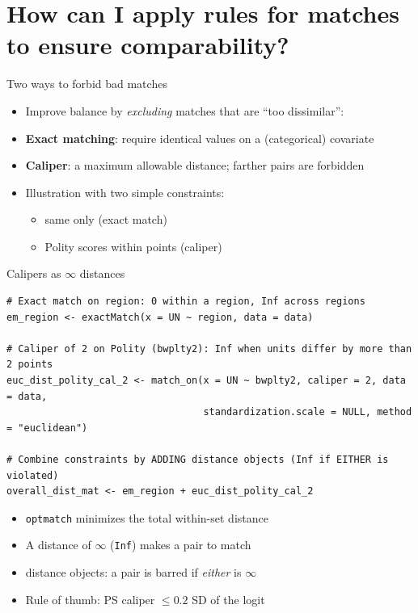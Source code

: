 \documentclass[table, xcolor = {dvipsnames}, 9pt]{beamer}
\theoremstyle{plain}
\newcommand{\mh}[1]{{\color{magenta}{#1}}}
\begin{document}
\section{How can I apply rules for matches to ensure comparability?}

\begin{frame}[t]{Two ways to forbid bad matches}
\vfill
\begin{itemize} \vfill
\item Improve balance by \emph{excluding} matches that are ``too dissimilar'': \vfill
\item \textbf{Exact matching}: require identical values on a (categorical) covariate \vfill
\item \textbf{Caliper}: a maximum allowable distance; farther pairs are forbidden \vfill
\item Illustration with two simple constraints: \vfill
\begin{itemize} \vfill
\item same \mh{region} only (exact match) \vfill
\item Polity scores within \mh{2} points (caliper) \vfill
\end{itemize} \vfill
\end{itemize} \vfill
\end{frame}
\begin{frame}[fragile]{Calipers as $\infty$ distances}
\begin{lstlisting}[style=Rstyle, basicstyle=\ttfamily\tiny, frame=single]
# Exact match on region: 0 within a region, Inf across regions
em_region <- exactMatch(x = UN ~ region, data = data)

# Caliper of 2 on Polity (bwplty2): Inf when units differ by more than 2 points
euc_dist_polity_cal_2 <- match_on(x = UN ~ bwplty2, caliper = 2, data = data,
                                  standardization.scale = NULL, method = "euclidean")

# Combine constraints by ADDING distance objects (Inf if EITHER is violated)
overall_dist_mat <- em_region + euc_dist_polity_cal_2
\end{lstlisting}
\begin{itemize} \vfill
\item \texttt{optmatch} minimizes the total within-set distance \vfill
\item A distance of $\infty$ (\texttt{Inf}) makes a pair \mh{impossible} to match \vfill
\item \mh{Adding} distance objects: a pair is barred if \emph{either} is $\infty$ \vfill
\item Rule of thumb: PS caliper $\le 0.2$ SD of the logit \\ \citep{cochranrubin1973} \vfill
\end{itemize}
\end{frame}
\end{document}
